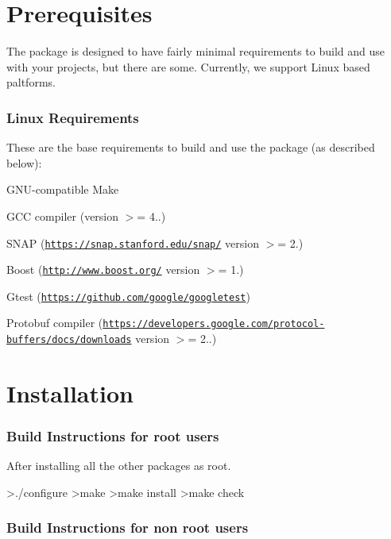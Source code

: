 \hypertarget{Install_Prerequisites}{}\section{Prerequisites}\label{Install_Prerequisites}
The package is designed to have fairly minimal requirements to build and use with your projects, but there are some. Currently, we support Linux based paltforms.

\subsubsection*{Linux Requirements}

These are the base requirements to build and use the package (as described below)\+:
\begin{DoxyEnumerate}
\item G\+N\+U-\/compatible Make
\item G\+C\+C compiler (version $>$= 4..)
\item S\+N\+A\+P (\href{https://snap.stanford.edu/snap/}{\tt https\+://snap.\+stanford.\+edu/snap/} version $>$= 2.)
\item Boost (\href{http://www.boost.org/}{\tt http\+://www.\+boost.\+org/} version $>$= 1.)
\item Gtest (\href{https://github.com/google/googletest}{\tt https\+://github.\+com/google/googletest})
\item Protobuf compiler (\href{https://developers.google.com/protocol-buffers/docs/downloads}{\tt https\+://developers.\+google.\+com/protocol-\/buffers/docs/downloads} version $>$= 2..)
\end{DoxyEnumerate}\hypertarget{Install_install_sec}{}\section{Installation}\label{Install_install_sec}
\subsubsection*{Build Instructions for root users}

After installing all the other packages as root. \begin{DoxyVerb}>./configure
>make
>make install
>make check
\end{DoxyVerb}


\subsubsection*{Build Instructions for non root users}

